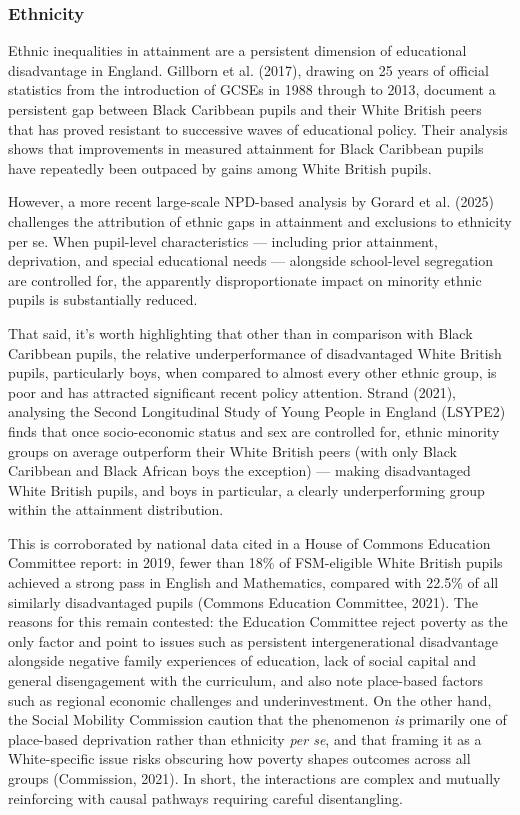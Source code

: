 \documentclass[
  11pt,
]{article}
\begin{document}
\subsubsection{Ethnicity}\label{ethnicity}

Ethnic inequalities in attainment are a persistent dimension of
educational disadvantage in England. Gillborn et al. (2017), drawing on
25 years of official statistics from the introduction of GCSEs in 1988
through to 2013, document a persistent gap between Black Caribbean
pupils and their White British peers that has proved resistant to
successive waves of educational policy. Their analysis shows that
improvements in measured attainment for Black Caribbean pupils have
repeatedly been outpaced by gains among White British pupils.

However, a more recent large-scale NPD-based analysis by Gorard et al.
(2025) challenges the attribution of ethnic gaps in attainment and
exclusions to ethnicity per se. When pupil-level characteristics ---
including prior attainment, deprivation, and special educational needs
--- alongside school-level segregation are controlled for, the
apparently disproportionate impact on minority ethnic pupils is
substantially reduced.

That said, it's worth highlighting that other than in comparison with
Black Caribbean pupils, the relative underperformance of disadvantaged
White British pupils, particularly boys, when compared to almost every
other ethnic group, is poor and has attracted significant recent policy
attention. Strand (2021), analysing the Second Longitudinal Study of
Young People in England (LSYPE2) finds that once socio-economic status
and sex are controlled for, ethnic minority groups on average outperform
their White British peers (with only Black Caribbean and Black African
boys the exception) --- making disadvantaged White British pupils, and
boys in particular, a clearly underperforming group within the
attainment distribution.

This is corroborated by national data cited in a House of Commons
Education Committee report: in 2019, fewer than 18\% of FSM-eligible
White British pupils achieved a strong pass in English and Mathematics,
compared with 22.5\% of all similarly disadvantaged pupils (Commons
Education Committee, 2021). The reasons for this remain contested: the
Education Committee reject poverty as the only factor and point to
issues such as persistent intergenerational disadvantage alongside
negative family experiences of education, lack of social capital and
general disengagement with the curriculum, and also note place-based
factors such as regional economic challenges and underinvestment. On the
other hand, the Social Mobility Commission caution that the phenomenon
\emph{is} primarily one of place-based deprivation rather than ethnicity
\emph{per se}, and that framing it as a White-specific issue risks
obscuring how poverty shapes outcomes across all groups (Commission,
2021). In short, the interactions are complex and mutually reinforcing
with causal pathways requiring careful disentangling.
\end{document}
